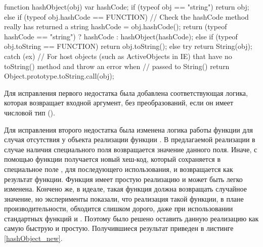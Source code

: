 \begin{code}
\begin{JavaScript}[caption=Оригинальная версия функции hashObject, label=hashObject_original]
function hashObject(obj) {
    var hashCode;
    if (typeof obj == "string") {
        return obj;
    }
    else if (typeof obj.hashCode == FUNCTION) {
        // Check the hashCode method really has returned a string
        hashCode = obj.hashCode();
        return (typeof hashCode == "string") ? hashCode : hashObject(hashCode);
    }
    else if (typeof obj.toString == FUNCTION) {
        return obj.toString();
    }
    else {
        try {
            return String(obj);
        }
        catch (ex) {
            // For host objects (such as ActiveObjects in IE) that have no toString() method and throw an error when
            // passed to String()
            return Object.prototype.toString.call(obj);
        }
    }
}
\end{JavaScript}
\end{code}

Для исправления первого недостатка была добавлена соответствующая логика, которая возвращает входной аргумент, без преобразований, если он имеет числовой тип ().

Для исправления второго недостатка была изменена логика работы функции для случая отсутствия у объекта реализации функции . В предлагаемой реализации в случае наличия специального поля  возвращается значение данного поля. Иначе, с помощью функции  получается новый хеш-код, который сохраняется в специальное поле , для последующего использования, и возвращается как результат функции.
Функция  имеет простую реализацию и может быть легко изменена. Кончено же, в идеале, такая функция должна возвращать случайное значение, но эксперименты показали, что реализация такой функции, в плане производительности, обходится слишком дорого, даже при использовании стандартных функций  и . Поэтому было решено оставить данную реализацию как самую быструю и простую.
Получившиеся результат приведен в листинге \ref{hashObject_new}.

